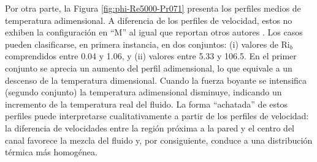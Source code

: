%
%



Por otra parte, la Figura \ref{fig:phi-Re5000-Pr071} presenta los perfiles medios de temperatura adimensional. A diferencia de los perfiles de velocidad, estos no exhiben la configuración en ``M'' al igual que reportan otros autores \cite{you2003direct, steiner1971reverse}. Los casos pueden clasificarse, en primera instancia, en dos conjuntos: (i) valores de Ri$_b$ comprendidos entre 0.04 y 1.06, y (ii) valores entre 5.33 y 106.5. En el primer conjunto se aprecia un aumento del perfil adimensional, lo que equivale a un descenso de la temperatura dimensional. Cuando la fuerza boyante se intensifica (segundo conjunto) la temperatura adimensional disminuye, indicando un incremento de la temperatura real del fluido. La forma ``achatada'' de estos perfiles puede interpretarse cualitativamente a partir de los perfiles de velocidad: la diferencia de velocidades entre la región próxima a la pared y el centro del canal favorece la mezcla del fluido y, por consiguiente, conduce a una distribución térmica más homogénea.

